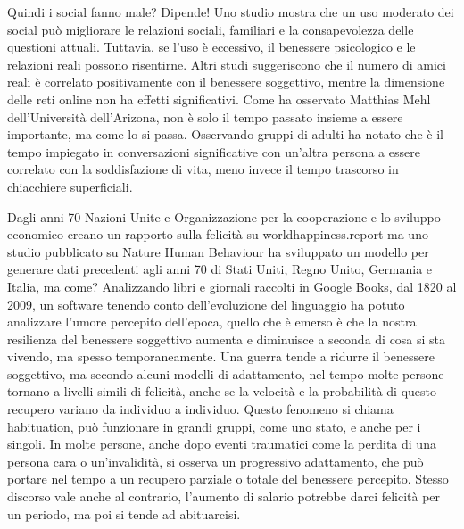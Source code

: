 \documentclass[12pt]{book} %
\begin{document}
\begin{mdframed}[linewidth=1pt]
Quindi i social fanno male? Dipende! Uno studio mostra che un uso moderato dei social può migliorare le relazioni sociali, familiari e la consapevolezza delle questioni attuali. Tuttavia, se l’uso è eccessivo, il benessere psicologico e le relazioni reali possono risentirne. Altri studi  suggeriscono che il numero di amici reali è correlato positivamente con il benessere soggettivo, mentre la dimensione delle reti online non ha effetti significativi.
Come ha osservato Matthias Mehl dell'Università dell'Arizona, non è solo il tempo passato
insieme a essere importante, ma come lo si passa. Osservando gruppi di adulti ha notato che è il tempo impiegato in
conversazioni significative con un'altra persona a essere correlato con la soddisfazione di vita, meno invece il tempo trascorso in chiacchiere superficiali. 
\end{mdframed}

Dagli anni 70 Nazioni Unite e Organizzazione per la cooperazione e lo sviluppo economico creano un rapporto sulla
felicità su worldhappiness.report ma uno studio pubblicato su Nature Human
Behaviour ha sviluppato un modello per generare dati
precedenti agli anni 70 di Stati Uniti, Regno Unito, Germania e Italia, ma come? Analizzando libri e giornali raccolti
in Google Books, dal 1820 al 2009, un software tenendo conto dell'evoluzione del linguaggio ha
potuto analizzare l'umore percepito dell'epoca, quello che è emerso è che la
nostra resilienza del benessere soggettivo aumenta e diminuisce a seconda di cosa si sta vivendo, ma spesso temporaneamente. Una guerra tende a ridurre il benessere soggettivo, ma secondo alcuni modelli di adattamento, nel tempo molte persone tornano a livelli simili di felicità, anche se la velocità e la probabilità di questo recupero variano da individuo a individuo. Questo fenomeno si chiama habituation, può funzionare in grandi gruppi, come uno
stato, e anche per i singoli. In molte persone, anche dopo eventi traumatici come la perdita di una persona cara o un’invalidità, si osserva un progressivo adattamento, che può portare nel tempo a un recupero parziale o totale del benessere percepito. Stesso discorso vale anche
al contrario, l'aumento di salario potrebbe darci felicità per un periodo, ma poi si tende ad abituarcisi.
\end{document}
